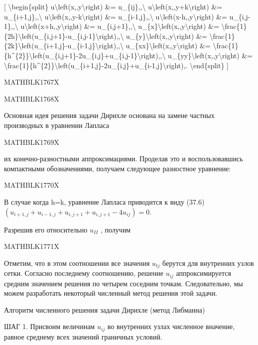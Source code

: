 \documentclass[
]{article}
\begin{document}
{[} \textbackslash begin\{split\}
u\textbackslash left(x,,y\textbackslash right) \&=
u\_\{ij\},,\textbackslash{}
u\textbackslash left(x,,y+k\textbackslash right) \&=
u\_\{i+1,j\},,\textbackslash{}
u\textbackslash left(x,,y-k\textbackslash right) \&=
u\_\{i-1,j\},,\textbackslash{}
u\textbackslash left(x-h,,y\textbackslash right) \&=
u\_\{i,j-1\},,\textbackslash{}
u\textbackslash left(x+h,,y\textbackslash right) \&=
u\_\{i,j+1\},,\textbackslash{}
u\_\{x\}\textbackslash left(x,,y\textbackslash right) \&=
\textbackslash frac\{1\}\{2h\}\textbackslash left(u\_\{i,j+1\}-u\_\{i,j-1\}\textbackslash right),,\textbackslash{}
u\_\{y\}\textbackslash left(x,,y\textbackslash right) \&=
\textbackslash frac\{1\}\{2k\}\textbackslash left(u\_\{i+1,j\}-u\_\{i-1,j\}\textbackslash right),,\textbackslash{}
u\_\{xx\}\textbackslash left(x,,y\textbackslash right) \&=
\textbackslash frac\{1\}\{h\^{}\{2\}\}\textbackslash left(u\_\{i,j+1\}-2u\_\{i,j\}+u\_\{i,j-1\}\textbackslash right),,\textbackslash{}
u\_\{yy\}\textbackslash left(x,,y\textbackslash right) \&=
\textbackslash frac\{1\}\{h\^{}\{2\}\}\textbackslash left(u\_\{i+1,j\}-2u\_\{i,j\}+u\_\{i-1,j\}\textbackslash right),.
\textbackslash end\{split\} {]}

MATHBLK1767X

MATHBLK1768X

Основная идея решения задачи Дирихле основана на замене частных
производных в уравнении Лапласа

MATHBLK1769X

их конечно-разностными аппроксимациями. Проделав это и воспользовавшись
компактными обозначениями, получаем следующее разностное уравнение:

MATHBLK1770X

В случае когда h=k, уравнение Лапласа приводится к виду (37.6)
\((u_{i+1,j}+u_{i-1,j}+u_{i,j+1}+u_{i,j+1}-4u_{ij})=0.\)

Разрешив его относительно \(u_{II}\) , получим

MATHBLK1771X

Отметим, что в этом соотношении все значения \(u_{tj}\) берутся для
внутренних узлов сетки. Согласно последнему соотношению, решение
\(u_{ij}\) аппроксимируется средним значением решения по четырем
соседним точкам. Следовательно, мы можем разработать некоторый численный
метод решения этой задачи.

Алгоритм численного решения задачи Дирихле (метод Либманна)

ШАГ 1. Присвоим величинам \(u_{ij}\) во внутренних узлах численное
вначение, равное среднему всех значений граничных условий.
\end{document}
